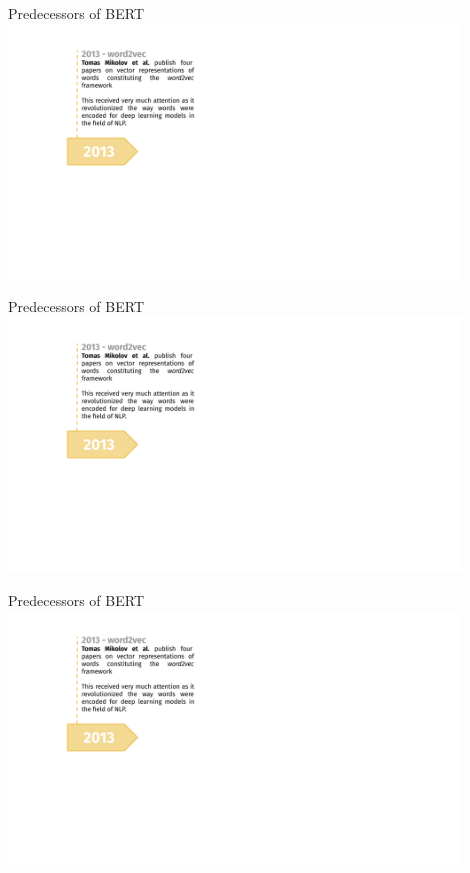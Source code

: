 \begin{vbframe}{Predecessors of BERT}
\hbox{\hspace{-3em} \includegraphics[width=12cm,page=1]{figure/transfer_learning_timeline1_nlp.pdf}}
\end{vbframe}
\begin{vbframe}{Predecessors of BERT}
\hbox{\hspace{-3em} \includegraphics[width=12cm,page=2]{figure/transfer_learning_timeline1_nlp.pdf}}
\end{vbframe}
\begin{vbframe}{Predecessors of BERT}
\hbox{\hspace{-3em} \includegraphics[width=12cm,page=3]{figure/transfer_learning_timeline1_nlp.pdf}}
\end{vbframe}
